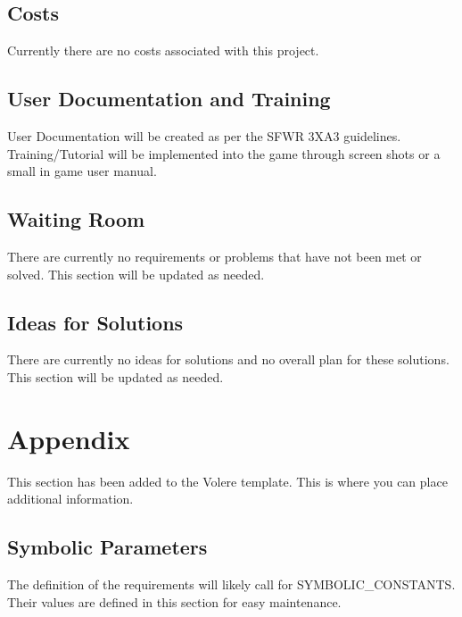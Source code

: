 \documentclass[12pt, titlepage]{article}
\begin{document}
\subsection{Costs}
Currently there are no costs associated with this project.

\subsection{User Documentation and Training}
User Documentation will be created as per the SFWR 3XA3 guidelines. Training/Tutorial will be implemented into the game through screen shots or a small in game user manual.

\subsection{Waiting Room}
There are currently no requirements or problems that have not been met or solved. This section will be updated as needed.

\subsection{Ideas for Solutions}
There are currently no ideas for solutions and no overall plan for these solutions. This section will be updated as needed.





\newpage

\section{Appendix}

This section has been added to the Volere template.  This is where you can place
additional information.

\subsection{Symbolic Parameters}

The definition of the requirements will likely call for SYMBOLIC\_CONSTANTS.
Their values are defined in this section for easy maintenance.
\end{document}
